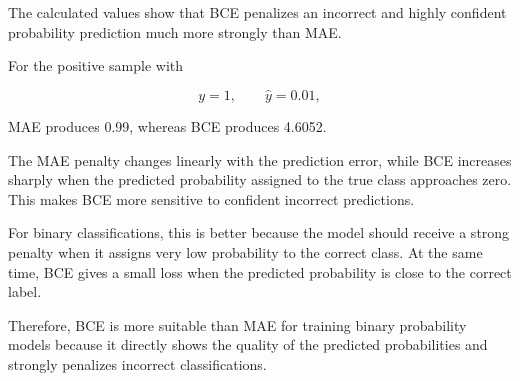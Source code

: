 \documentclass[11pt]{article}
\begin{document}
The calculated values show that BCE penalizes an incorrect and highly
confident probability prediction much more strongly than MAE.

For the positive sample with

\[
y=1,\qquad \hat{y}=0.01,
\]

MAE produces 0.99, whereas BCE produces 4.6052.

The MAE penalty changes linearly with the prediction error, while BCE
increases sharply when the predicted probability assigned to the true
class approaches zero. This makes BCE more sensitive to confident
incorrect predictions.

For binary classifications, this is better because the model should
receive a strong penalty when it assigns very low probability to the
correct class. At the same time, BCE gives a small loss when the
predicted probability is close to the correct label.

Therefore, BCE is more suitable than MAE for training binary probability
models because it directly shows the quality of the predicted
probabilities and strongly penalizes incorrect classifications.


    
    
    
\end{document}

